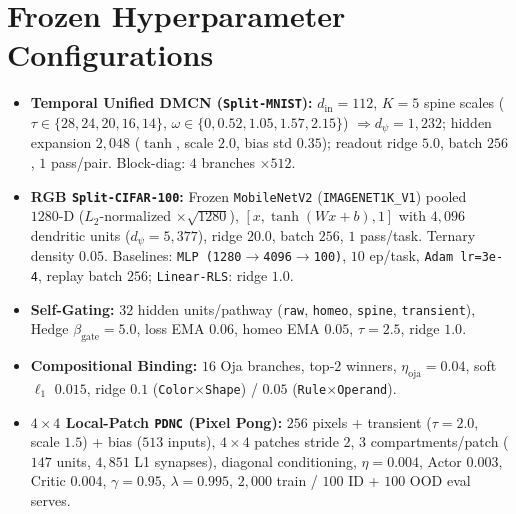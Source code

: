 \documentclass[11pt,a4paper]{article}
\begin{document}
\section{Frozen Hyperparameter Configurations}
\begin{itemize}
    \item \textbf{Temporal Unified DMCN (\texttt{Split-MNIST}):} $d_{\text{in}}=112$, $K=5$ spine scales ($\tau \in \{28, 24, 20, 16, 14\}$, $\omega \in \{0, 0.52, 1.05, 1.57, 2.15\}$) $\Rightarrow d_\psi=1{,}232$; hidden expansion $2{,}048$ ($\tanh$, scale $2.0$, bias std $0.35$); readout ridge $5.0$, batch $256$, $1$ pass/pair. Block-diag: $4$ branches $\times 512$.
    \item \textbf{RGB \texttt{Split-CIFAR-100}:} Frozen \texttt{MobileNetV2} (\texttt{IMAGENET1K\_V1}) pooled $1280\text{-D}$ ($L_2$-normalized $\times\sqrt{1280}$), $[x, \tanh(Wx+b), 1]$ with $4{,}096$ dendritic units ($d_\psi=5{,}377$), ridge $20.0$, batch $256$, $1$ pass/task. Ternary density $0.05$. Baselines: \texttt{MLP (1280$\to$4096$\to$100)}, $10$ ep/task, \texttt{Adam lr=3e-4}, replay batch $256$; \texttt{Linear-RLS}: ridge $1.0$.
    \item \textbf{Self-Gating:} $32$ hidden units/pathway (\texttt{raw}, \texttt{homeo}, \texttt{spine}, \texttt{transient}), Hedge $\beta_{\text{gate}}=5.0$, loss EMA $0.06$, homeo EMA $0.05$, $\tau=2.5$, ridge $1.0$.
    \item \textbf{Compositional Binding:} $16$ Oja branches, top-$2$ winners, $\eta_{\text{oja}}=0.04$, soft $\ell_1$ $0.015$, ridge $0.1$ (\texttt{Color$\times$Shape}) / $0.05$ (\texttt{Rule$\times$Operand}).
    \item \textbf{$4\times 4$ Local-Patch \texttt{PDNC} (Pixel Pong):} $256$ pixels + transient ($\tau=2.0$, scale $1.5$) + bias ($513$ inputs), $4\times 4$ patches stride $2$, $3$ compartments/patch ($147$ units, $4{,}851$ L1 synapses), diagonal conditioning, $\eta=0.004$, Actor $0.003$, Critic $0.004$, $\gamma=0.95$, $\lambda=0.995$, $2{,}000$ train / $100$ ID + $100$ OOD eval serves.
\end{itemize}
\end{document}
